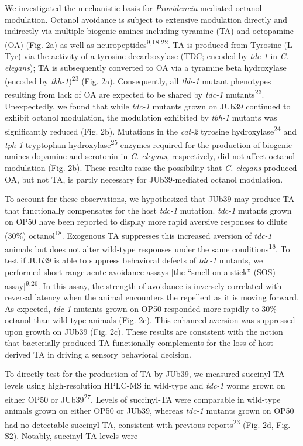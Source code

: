 \documentclass[11pt,]{article}
\begin{document}
We investigated the mechanistic basis for \textit{Providencia}-mediated
octanol modulation. Octanol avoidance is subject to extensive modulation
directly and indirectly via multiple biogenic amines including tyramine
(TA) and octopamine (OA) (Fig. 2a) as well as
neuropeptides\textsuperscript{9,18-22}. TA is produced from Tyrosine
(L-Tyr) via the activity of a tyrosine decarboxylase (TDC; encoded by
\emph{tdc-1} in \textit{C. elegans}); TA is subsequently converted to OA
via a tyramine beta hydroxylase (encoded by
\emph{tbh-1})\textsuperscript{23} (Fig. 2a). Consequently, all
\emph{tbh-1} mutant phenotypes resulting from lack of OA are expected to
be shared by \emph{tdc-1} mutants\textsuperscript{23}. Unexpectedly, we
found that while \emph{tdc-1} mutants grown on JUb39 continued to
exhibit octanol modulation, the modulation exhibited by \emph{tbh-1}
mutants was significantly reduced (Fig. 2b). Mutations in the
\emph{cat-2} tyrosine hydroxylase\textsuperscript{24} and \emph{tph-1}
tryptophan hydroxylase\textsuperscript{25} enzymes required for the
production of biogenic amines dopamine and serotonin in
\textit{C. elegans}, respectively, did not affect octanol modulation
(Fig. 2b). These results raise the possibility that
\textit{C. elegans}-produced OA, but not TA, is partly necessary for
JUb39-mediated octanol modulation.

To account for these observations, we hypothesized that JUb39 may
produce TA that functionally compensates for the host \emph{tdc-1}
mutation. \emph{tdc-1} mutants grown on OP50 have been reported to
display more rapid aversive responses to dilute (30\%)
octanol\textsuperscript{18}. Exogenous TA suppresses this increased
aversion of \emph{tdc-1} animals but does not alter wild-type responses
under the same conditions\textsuperscript{18}. To test if JUb39 is able
to suppress behavioral defects of \emph{tdc-1} mutants, we performed
short-range acute avoidance assays {[}the ``smell-on-a-stick'' (SOS)
assay{]}\textsuperscript{9,26}. In this assay, the strength of avoidance
is inversely correlated with reversal latency when the animal encounters
the repellent as it is moving forward. As expected, \emph{tdc-1} mutants
grown on OP50 responded more rapidly to 30\% octanol than wild-type
animals (Fig. 2c). This enhanced aversion was suppressed upon growth on
JUb39 (Fig. 2c). These results are consistent with the notion that
bacterially-produced TA functionally complements for the loss of
host-derived TA in driving a sensory behavioral decision.

To directly test for the production of TA by JUb39, we measured
succinyl-TA levels using high-resolution HPLC-MS in wild-type and
\emph{tdc-1} worms grown on either OP50 or JUb39\textsuperscript{27}.
Levels of succinyl-TA were comparable in wild-type animals grown on
either OP50 or JUb39, whereas \emph{tdc-1} mutants grown on OP50 had no
detectable succinyl-TA, consistent with previous
reports\textsuperscript{23} (Fig. 2d, Fig. S2). Notably, succinyl-TA
levels were \linebreak
\end{document}
